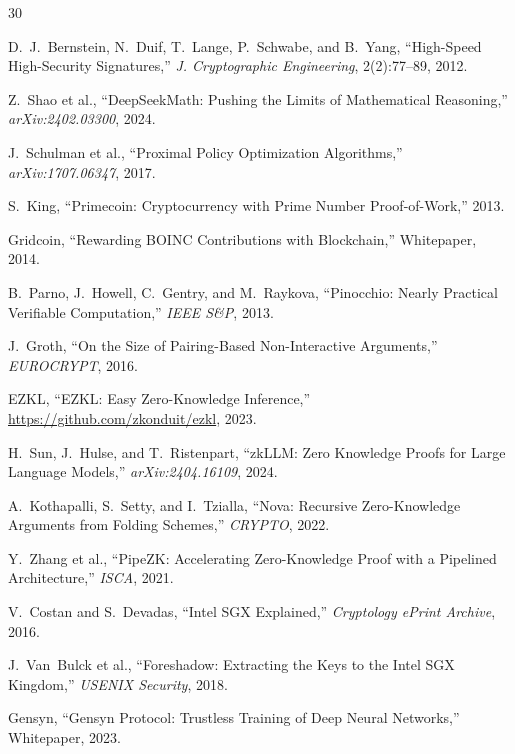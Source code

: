 \documentclass[11pt,letterpaper]{article}
\begin{document}

\begin{thebibliography}{30}

D.~J.~Bernstein, N.~Duif, T.~Lange, P.~Schwabe, and B.~Yang, ``High-Speed High-Security Signatures,'' \textit{J. Cryptographic Engineering}, 2(2):77--89, 2012.

Z.~Shao et al., ``DeepSeekMath: Pushing the Limits of Mathematical Reasoning,'' \textit{arXiv:2402.03300}, 2024.

J.~Schulman et al., ``Proximal Policy Optimization Algorithms,'' \textit{arXiv:1707.06347}, 2017.

S.~King, ``Primecoin: Cryptocurrency with Prime Number Proof-of-Work,'' 2013.

Gridcoin, ``Rewarding BOINC Contributions with Blockchain,'' Whitepaper, 2014.

B.~Parno, J.~Howell, C.~Gentry, and M.~Raykova, ``Pinocchio: Nearly Practical Verifiable Computation,'' \textit{IEEE S\&P}, 2013.

J.~Groth, ``On the Size of Pairing-Based Non-Interactive Arguments,'' \textit{EUROCRYPT}, 2016.

EZKL, ``EZKL: Easy Zero-Knowledge Inference,'' \url{https://github.com/zkonduit/ezkl}, 2023.

H.~Sun, J.~Hulse, and T.~Ristenpart, ``zkLLM: Zero Knowledge Proofs for Large Language Models,'' \textit{arXiv:2404.16109}, 2024.

A.~Kothapalli, S.~Setty, and I.~Tzialla, ``Nova: Recursive Zero-Knowledge Arguments from Folding Schemes,'' \textit{CRYPTO}, 2022.

Y.~Zhang et al., ``PipeZK: Accelerating Zero-Knowledge Proof with a Pipelined Architecture,'' \textit{ISCA}, 2021.

V.~Costan and S.~Devadas, ``Intel SGX Explained,'' \textit{Cryptology ePrint Archive}, 2016.

J.~Van~Bulck et al., ``Foreshadow: Extracting the Keys to the Intel SGX Kingdom,'' \textit{USENIX Security}, 2018.

Gensyn, ``Gensyn Protocol: Trustless Training of Deep Neural Networks,'' Whitepaper, 2023.


\end{thebibliography}
\end{document}
